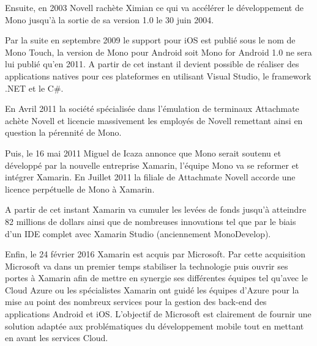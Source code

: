\documentclass[11]{article}
\begin{document}
\vspace{0.5cm}
   
Ensuite, en 2003 Novell rachète Ximian ce qui va accélérer le développement de Mono jusqu’à la sortie de sa version 1.0 le 30 juin 2004.
     
\vspace{0.5cm}
   
Par la suite en septembre 2009 le support pour iOS est publié sous le nom de Mono Touch, la version de Mono pour Android soit Mono for Android 1.0 ne sera lui publié qu’en 2011. A partir de cet instant il devient possible de réaliser des applications natives pour ces plateformes en utilisant Visual Studio, le framework .NET et le C#.
      
\vspace{0.5cm}
   
En Avril 2011 la société spécialisée dans l’émulation de terminaux Attachmate achète Novell et licencie massivement les employés de Novell remettant ainsi en question la pérennité de Mono.
      
\vspace{0.5cm}
   
Puis, le 16 mai 2011 Miguel de Icaza annonce que Mono serait soutenu et développé par la nouvelle entreprise Xamarin, l’équipe Mono va se reformer et intégrer Xamarin. En Juillet 2011 la filiale de Attachmate Novell accorde une licence perpétuelle de Mono à Xamarin.
      
\vspace{0.5cm}
   
A partir de cet instant Xamarin va cumuler les levées de fonds jusqu’à atteindre 82 millions de dollars ainsi que de nombreuses innovations tel que par le biais d’un IDE complet avec Xamarin Studio (anciennement MonoDevelop).
      
\vspace{0.5cm}
   
Enfin, le 24 février 2016 Xamarin est acquis par Microsoft. Par cette acquisition Microsoft va dans un premier temps stabiliser la technologie puis ouvrir ses portes à Xamarin afin de mettre en synergie ses différentes équipes tel qu’avec le Cloud Azure ou les spécialistes Xamarin ont guidé les équipes d’Azure pour la mise au point des nombreux services pour la gestion des back-end des applications Android et iOS.
L’objectif de Microsoft est clairement de fournir une solution adaptée aux problématiques du développement mobile tout en mettant en avant les services Cloud.
      
\end{document}
